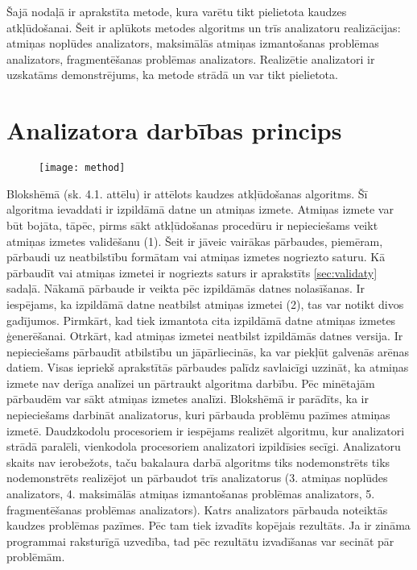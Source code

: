 ﻿Šajā nodaļā ir aprakstīta metode, kura varētu tikt pielietota kaudzes atkļūdošanai. 
Šeit ir aplūkots metodes algoritms un trīs analizatoru realizācijas: atmiņas noplūdes analizators, maksimālās atmiņas izmantošanas problēmas analizators, fragmentēšanas problēmas analizators.
Realizētie analizatori ir uzskatāms demonstrējums, ka metode strādā un var tikt pielietota.
\section{Analizatora darbības princips}

 \begin{figure}[h]
\begin{center}
\texttt{[image: method]}
\end{center}
\caption{\textbf{\fontsize{11}{12}\selectfont {Uz metodi balstītā algoritma blokshēma}}}
\end{figure}

Blokshēmā (sk. 4.1. attēlu) ir attēlots kaudzes atkļūdošanas algoritms.
Šī algoritma ievaddati ir izpildāmā datne un atmiņas izmete.
Atmiņas izmete var būt bojāta, tāpēc, pirms sākt atkļūdošanas procedūru ir nepieciešams veikt atmiņas izmetes validēšanu (1).
Šeit ir jāveic vairākas pārbaudes, piemēram, pārbaudi uz neatbilstību formātam vai atmiņas izmetes nogriezto saturu.
Kā pārbaudīt vai atmiņas izmetei ir nogriezts saturs ir aprakstīts \ref{sec:validaty} sadaļā.
Nākamā pārbaude ir veikta pēc izpildāmās datnes nolasīšanas.
Ir iespējams, ka izpildāmā datne neatbilst atmiņas izmetei (2), tas var notikt divos gadījumos.
Pirmkārt, kad tiek izmantota cita izpildāmā datne atmiņas izmetes ģenerēšanai.
Otrkārt, kad atmiņas izmetei neatbilst izpildāmās datnes versija.
Ir nepieciešams pārbaudīt atbilstību un jāpārliecinās, ka var piekļūt galvenās arēnas datiem.
Visas iepriekš aprakstītās pārbaudes palīdz savlaicīgi uzzināt, ka atmiņas izmete nav derīga analīzei un pārtraukt algoritma darbību.
Pēc minētajām pārbaudēm var sākt atmiņas izmetes analīzi.
Blokshēmā ir parādīts, ka ir nepieciešams darbināt analizatorus, kuri  pārbauda problēmu pazīmes atmiņas izmetē.
Daudzkodolu procesoriem ir iespējams realizēt algoritmu, kur analizatori strādā paralēli, vienkodola procesoriem analizatori izpildīsies secīgi.
Analizatoru skaits nav ierobežots, taču bakalaura darbā algoritms tiks nodemonstrēts tiks nodemonstrēts realizējot un pārbaudot trīs analizatorus (3. atmiņas noplūdes analizators, 4. maksimālās atmiņas izmantošanas problēmas analizators, 5. fragmentēšanas problēmas analizators).
Katrs analizators pārbauda noteiktās kaudzes problēmas pazīmes.
Pēc tam tiek izvadīts kopējais rezultāts.
Ja ir zināma programmai raksturīgā uzvedība, tad pēc rezultātu izvadīšanas var secināt pār problēmām.

